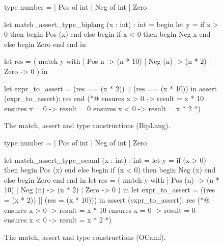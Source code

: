 \begin{figure}
\begin{minipage}{\linewidth}
\begin{biplangenv}
  type number = 
    | Pos of int
    | Neg of int
    | Zero

  let match_assert_type_biplang (x : int) : int = begin
    let y = 
      if x > 0 then begin Pos (x) end
      else begin
        if x < 0 then begin Neg x end
        else begin Zero end
      end
    in  

    let res = (
      match y with
      | Pos n -> (n * 10)
      | Neg (n) -> (n * 2)
      | Zero -> 0
    ) in
    
    let expr_to_assert = (res == (x * 2)) || (res == (x * 10)) in
    assert (expr_to_assert);
    res
  end
  (*@ ensures x > 0 -> result = x * 10
      ensures x = 0 -> result = 0
      ensures x < 0 -> result = x * 2 *)
\end{biplangenv}
\end{minipage}
\caption{The match, assert and type constructions (BipLang).}
\end{figure}

\begin{figure}
\begin{minipage}{\linewidth}
\begin{gospel}
  type number =
    | Pos of int
    | Neg of int
    | Zero

  let match_assert_type_ocaml (x : int) : int =
    let y = 
      if (x > 0)
      then begin 
        Pos (x)
      end else begin 
        if (x < 0)
        then begin 
          Neg (x)
        end else begin 
          Zero
        end
      end
    in
    let res = (
      match y with
      | Pos (n) -> (n * 10)
      | Neg (n) -> (n * 2)
      | Zero -> 0
    ) in
    let expr_to_assert = ((res = (x * 2)) || (res = (x * 10))) in
    assert (expr_to_assert);
    res
  (*@ ensures x > 0 -> result = x * 10
      ensures x = 0 -> result = 0
      ensures x < 0 -> result = x * 2 *)
\end{gospel}
\end{minipage}
\caption{The match, assert and type constructions (OCaml).}
\end{figure}

